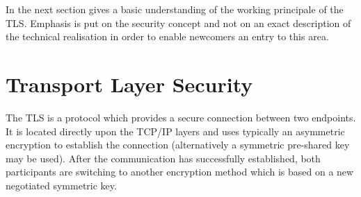 In the next section gives a basic understanding of the working principale of the TLS. Emphasis is put on the security concept and not on an exact description of the technical realisation in order to enable newcomers an entry to  this area.




\section{Transport Layer Security}


The TLS is a protocol which provides a secure connection between two endpoints. It is located directly upon the TCP/IP layers and uses typically an asymmetric encryption to establish the connection (alternatively a symmetric pre-shared key may be used). After the communication has successfully established, both participants are switching to another encryption method which is based on a new negotiated symmetric key.\\
%
%


